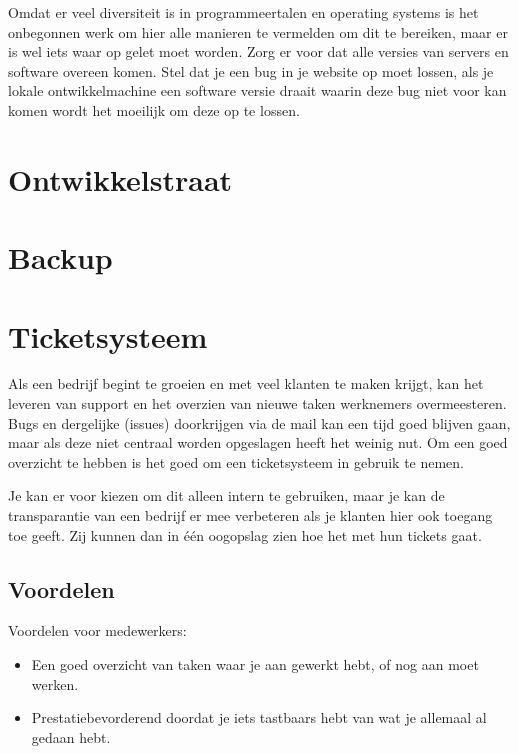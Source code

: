 Omdat er veel diversiteit is in programmeertalen en operating systems is het onbegonnen werk om hier alle manieren te vermelden om dit te bereiken, maar er is wel iets waar op gelet moet worden. Zorg er voor dat alle versies van servers en software overeen komen. Stel dat je een bug in je website op moet lossen, als je lokale ontwikkelmachine een software versie draait waarin deze bug niet voor kan komen wordt het moeilijk om deze op te lossen.

\section{Ontwikkelstraat}



\section{Backup}



\section{Ticketsysteem}

Als een bedrijf begint te groeien en met veel klanten te maken krijgt, kan het leveren van support en het overzien van nieuwe taken werknemers overmeesteren. Bugs en dergelijke (issues) doorkrijgen via de mail kan een tijd goed blijven gaan, maar als deze niet centraal worden opgeslagen heeft het weinig nut. Om een goed overzicht te hebben is het goed om een ticketsysteem in gebruik te nemen.

Je kan er voor kiezen om dit alleen intern te gebruiken, maar je kan de transparantie van een bedrijf er mee verbeteren als je klanten hier ook toegang toe geeft. Zij kunnen dan in \'{e}\'{e}n oogopslag zien hoe het met hun tickets gaat.

\subsection{Voordelen}

Voordelen voor medewerkers:

\begin{itemize}
  \item Een goed overzicht van taken waar je aan gewerkt hebt, of nog aan moet werken.
  \item Prestatiebevorderend doordat je iets tastbaars hebt van wat je allemaal al gedaan hebt.
\end{itemize}

